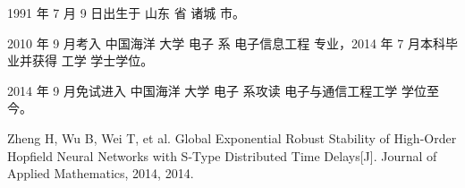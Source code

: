 \begin{resume}


  1991 年 7 月 9 日出生于 山东 省 诸城 市。

  2010 年 9 月考入 中国海洋 大学 电子 系 电子信息工程 专业，2014 年 7 月本科毕业并获得 工学 学士学位。

  2014 年 9 月免试进入 中国海洋 大学 电子 系攻读 电子与通信工程工学 学位至今。


  \begin{publications}
    \item Zheng H, Wu B, Wei T, et al. Global Exponential Robust Stability of High-Order Hopfield Neural Networks with S-Type Distributed Time Delays[J]. Journal of Applied Mathematics, 2014, 2014.
  \end{publications}

\end{resume}
